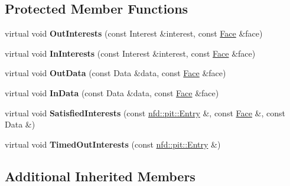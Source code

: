 \subsection*{Protected Member Functions}
\begin{DoxyCompactItemize}
\item 
virtual void {\bfseries Out\+Interests} (const Interest \&interest, const \hyperlink{classnfd_1_1Face}{Face} \&face)\hypertarget{classns3_1_1ndn_1_1L3RateTracer_ae0bfac08fada2b893add57f81503f62f}{}\label{classns3_1_1ndn_1_1L3RateTracer_ae0bfac08fada2b893add57f81503f62f}

\item 
virtual void {\bfseries In\+Interests} (const Interest \&interest, const \hyperlink{classnfd_1_1Face}{Face} \&face)\hypertarget{classns3_1_1ndn_1_1L3RateTracer_ac06ee7ed68f8cfecd87cd7ebd784ab52}{}\label{classns3_1_1ndn_1_1L3RateTracer_ac06ee7ed68f8cfecd87cd7ebd784ab52}

\item 
virtual void {\bfseries Out\+Data} (const Data \&data, const \hyperlink{classnfd_1_1Face}{Face} \&face)\hypertarget{classns3_1_1ndn_1_1L3RateTracer_a6a09a07bdd40135cbc5316259d9feec1}{}\label{classns3_1_1ndn_1_1L3RateTracer_a6a09a07bdd40135cbc5316259d9feec1}

\item 
virtual void {\bfseries In\+Data} (const Data \&data, const \hyperlink{classnfd_1_1Face}{Face} \&face)\hypertarget{classns3_1_1ndn_1_1L3RateTracer_a696765c600c36390e3046bc4a8fa2c28}{}\label{classns3_1_1ndn_1_1L3RateTracer_a696765c600c36390e3046bc4a8fa2c28}

\item 
virtual void {\bfseries Satisfied\+Interests} (const \hyperlink{classnfd_1_1pit_1_1Entry}{nfd\+::pit\+::\+Entry} \&, const \hyperlink{classnfd_1_1Face}{Face} \&, const Data \&)\hypertarget{classns3_1_1ndn_1_1L3RateTracer_ae3dc0bb824bf6ffaee0ad8826bb4c578}{}\label{classns3_1_1ndn_1_1L3RateTracer_ae3dc0bb824bf6ffaee0ad8826bb4c578}

\item 
virtual void {\bfseries Timed\+Out\+Interests} (const \hyperlink{classnfd_1_1pit_1_1Entry}{nfd\+::pit\+::\+Entry} \&)\hypertarget{classns3_1_1ndn_1_1L3RateTracer_adf9d7e5bb63d799ed3e867b1153045b5}{}\label{classns3_1_1ndn_1_1L3RateTracer_adf9d7e5bb63d799ed3e867b1153045b5}

\end{DoxyCompactItemize}
\subsection*{Additional Inherited Members}


